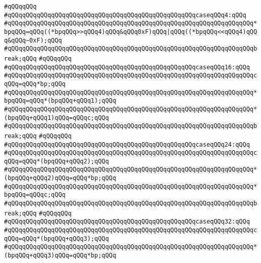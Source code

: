 \verb|#qQQqqQQq|\newline
\verb|#qQQqqQQqqQQqqQQqqQQqqQQqqQQqqQQqqQQqqQQqqQQqqQQqqQQqcaseqQQq4:qQQq|\newline
\verb|#qQQqqQQqqQQqqQQqqQQqqQQqqQQqqQQqqQQqqQQqqQQqqQQqqQQqqQQqqQQqqQQqqQQq*bpqQQq=qQQq((*bpqQQq>>qQQq4)qQQq&qQQq0xF)qQQq|\verb#|qQQq((*bpqQQq<<qQQq4)qQQq&qQQq~0xF);qQQq#\newline
\verb|#qQQqqQQqqQQqqQQqqQQqqQQqqQQqqQQqqQQqqQQqqQQqqQQqqQQqqQQqqQQqqQQqqQQqbreak;qQQq|\newline
\verb|#qQQqqQQq|\newline
\verb|#qQQqqQQqqQQqqQQqqQQqqQQqqQQqqQQqqQQqqQQqqQQqqQQqqQQqcaseqQQq16:qQQq|\newline
\verb|#qQQqqQQqqQQqqQQqqQQqqQQqqQQqqQQqqQQqqQQqqQQqqQQqqQQqqQQqqQQqqQQqqQQqcqQQq=qQQq*bp;qQQq|\newline
\verb|#qQQqqQQqqQQqqQQqqQQqqQQqqQQqqQQqqQQqqQQqqQQqqQQqqQQqqQQqqQQqqQQqqQQq*bpqQQq=qQQq*(bpqQQq+qQQq1);qQQq|\newline
\verb|#qQQqqQQqqQQqqQQqqQQqqQQqqQQqqQQqqQQqqQQqqQQqqQQqqQQqqQQqqQQqqQQqqQQq*(bpqQQq+qQQq1)qQQq=qQQqc;qQQq|\newline
\verb|#qQQqqQQqqQQqqQQqqQQqqQQqqQQqqQQqqQQqqQQqqQQqqQQqqQQqqQQqqQQqqQQqqQQqbreak;qQQq|\newline
\verb|#qQQqqQQq|\newline
\verb|#qQQqqQQqqQQqqQQqqQQqqQQqqQQqqQQqqQQqqQQqqQQqqQQqqQQqcaseqQQq24:qQQq|\newline
\verb|#qQQqqQQqqQQqqQQqqQQqqQQqqQQqqQQqqQQqqQQqqQQqqQQqqQQqqQQqqQQqqQQqqQQqcqQQq=qQQq*(bpqQQq+qQQq2);qQQq|\newline
\verb|#qQQqqQQqqQQqqQQqqQQqqQQqqQQqqQQqqQQqqQQqqQQqqQQqqQQqqQQqqQQqqQQqqQQq*(bpqQQq+qQQq2)qQQq=qQQq*bp;qQQq|\newline
\verb|#qQQqqQQqqQQqqQQqqQQqqQQqqQQqqQQqqQQqqQQqqQQqqQQqqQQqqQQqqQQqqQQqqQQq*bpqQQq=qQQqc;qQQq|\newline
\verb|#qQQqqQQqqQQqqQQqqQQqqQQqqQQqqQQqqQQqqQQqqQQqqQQqqQQqqQQqqQQqqQQqqQQqbreak;qQQq|\newline
\verb|#qQQqqQQq|\newline
\verb|#qQQqqQQqqQQqqQQqqQQqqQQqqQQqqQQqqQQqqQQqqQQqqQQqqQQqcaseqQQq32:qQQq|\newline
\verb|#qQQqqQQqqQQqqQQqqQQqqQQqqQQqqQQqqQQqqQQqqQQqqQQqqQQqqQQqqQQqqQQqqQQqcqQQq=qQQq*(bpqQQq+qQQq3);qQQq|\newline
\verb|#qQQqqQQqqQQqqQQqqQQqqQQqqQQqqQQqqQQqqQQqqQQqqQQqqQQqqQQqqQQqqQQqqQQq*(bpqQQq+qQQq3)qQQq=qQQq*bp;qQQq|\newline
